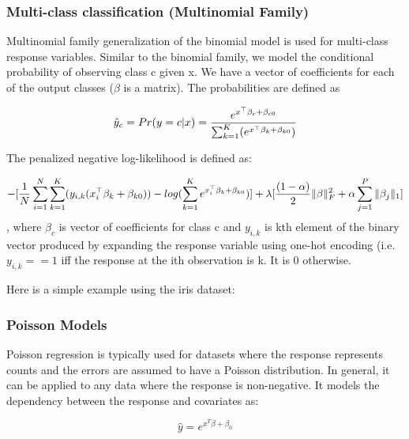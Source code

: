 \waterExampleInPython


\subsubsection{Multi-class classification (Multinomial Family)}
Multinomial family generalization of the binomial model is used for multi-class response variables. Similar to the
binomial family, we model the conditional probability of observing class c given x. We have a vector of coefficients
for each of the output classes ($\beta$ is a matrix). The probabilities are defined as

$$ \hat{y}_c = Pr(y = c|x) = {e^{x^{\top}\beta_c + \beta_{c0}} \over \sum_{k=1}^K (e^{x^{\top}\beta_k + \beta_{k0}}) }$$ 

The penalized negative log-likelihood is defined as:

$$
- \lbrack {1\over{N}} \sum_{i=1}^N\sum_{k=1}^K(y_{i,k}(x_i^{\top}\beta_k + \beta_{k0})) - log(\sum_{k=1}^Ke^{x_i^{\top}\beta_k + \beta_{k0}}) \rbrack + \lambda \lbrack {(1-\alpha) \over 2} \| \beta \|_F^2 + \alpha\sum_{j=1}^P \|\beta_j\|_1 \rbrack 
$$
, where $\beta_c$ is vector of coefficients for class c and $y_{i,k}$ is kth element of the binary vector produced by
expanding the response variable using one-hot encoding (i.e. $y_{i,k} == 1$ iff the response at the ith observation
is k. It is 0 otherwise.

Here is a simple example using the iris dataset:


\waterExampleInR


\waterExampleInPython



\subsubsection{Poisson Models}
Poisson regression is typically used for datasets where the response represents counts and the errors are assumed to have a Poisson distribution. In general, it can be applied to any data where the response is non-negative. It models the dependency between the response and covariates as: 
\nowidow[3]

$$\hat{y} = e^{x^T\beta + \beta_0}$$

